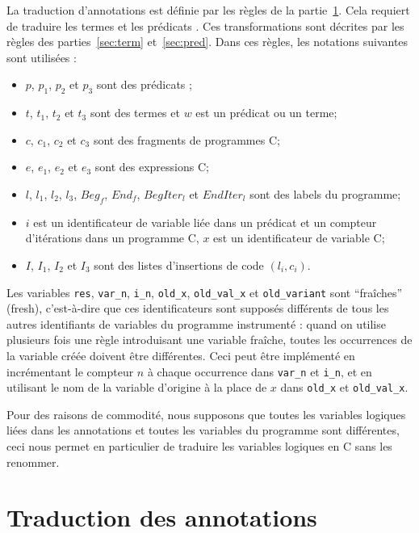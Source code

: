 La traduction d'annotations est définie par les règles de la
partie~\ref{sec:annot}.
Cela requiert de traduire les termes et les prédicats \eacsl.
Ces transformations sont décrites par les règles des parties~\ref{sec:term}
et~\ref{sec:pred}.
Dans ces règles, les notations suivantes sont utilisées :
\begin{itemize}
\item $p$, $p_1$, $p_2$ et $p_3$ sont des prédicats \eacsl;
\item $t$, $t_1$, $t_2$ et $t_3$ sont des termes \eacsl et $w$ est un prédicat
  ou un terme;
\item $c$, $c_1$, $c_2$ et $c_3$ sont des fragments de programmes C;
\item $e$, $e_1$, $e_2$ et $e_3$ sont des expressions C;
\item $l$, $l_1$, $l_2$, $l_3$, $Beg_f$, $End_f$, $BegIter_l$ et $EndIter_l$ sont
  des labels du programme;
\item $i$ est un identificateur de variable liée dans un prédicat \eacsl et un
  compteur d'itérations dans un programme C, $x$ est un identificateur de
  variable C;
\item $I$, $I_1$, $I_2$ et $I_3$ sont des listes d'insertions de code
  $(l_i, c_i)$.
\end{itemize}

Les variables \lstinline'res', \lstinline'var_n', \lstinline'i_n',
\lstinline|old_x|, \lstinline'old_val_x' et \lstinline|old_variant| sont
``fraîches'' (fresh), c'est-à-dire que ces identificateurs sont supposés
différents de tous les autres identifiants de variables du programme instrumenté
: quand on utilise plusieurs fois une règle introduisant une variable fraîche,
toutes les occurrences de la variable créée doivent être différentes.
Ceci peut être implémenté en incrémentant le compteur $n$ à chaque occurrence
dans \lstinline'var_n' et \lstinline'i_n', et en utilisant le nom de la variable
d'origine à la place de $x$ dans \lstinline'old_x' et \lstinline'old_val_x'.

Pour des raisons de commodité, nous supposons que toutes les variables logiques
liées dans les annotations et toutes les variables du programme sont
différentes, ceci nous permet en particulier de traduire les variables logiques
en C sans les renommer.

\section{Traduction des annotations \eacsl}
\label{sec:annot}


